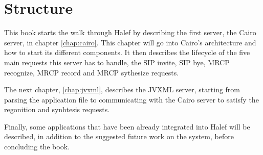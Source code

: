 \section{Structure}
This book starts the walk through Halef by describing the first server, the Cairo server, in chapter \ref{chap:cairo}.
This chapter will go into Cairo's architecture and how to start its different components.
It then describes the lifecycle of the five main requests this server has to handle, the SIP invite, SIP bye, MRCP recognize, MRCP record and MRCP sythesize requests.
\par
The next chapter, \ref{chap:jvxml}, describes the JVXML server, starting from parsing the application file to communicating with the Cairo server to satisfy the regonition and synhtesis requests.
\par
Finally, some applications that have been already integrated into Halef will be described, in addition to the suggested future work on the system, before concluding the book.
